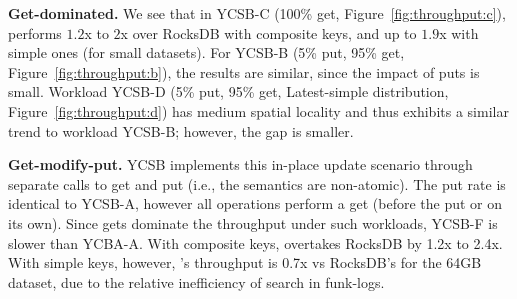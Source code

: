 
{\bf Get-dominated.} 
We see that in YCSB-C (100\% get, Figure~\ref{fig:throughput:c}), 
\sys\/ performs $1.2$x to $2$x over RocksDB with composite keys,
and up to $1.9$x  with simple ones (for small datasets). For YCSB-B (5\% put, 95\% get, Figure~\ref{fig:throughput:b}),
the results are similar, since the impact of puts is small.  
Workload YCSB-D (5\% put, 95\% get, Latest-simple distribution, Figure~\ref{fig:throughput:d})
has medium spatial locality and thus exhibits a similar trend to workload YCSB-B; however, the gap is smaller.%

{\bf Get-modify-put.} YCSB implements this in-place update scenario through separate calls to get and put (i.e., the semantics are non-atomic). 
The put rate is identical to YCSB-A, however all operations perform a get (before the put or on its own). Since gets dominate the throughput under such workloads, YCSB-F is slower than YCBA-A.
With composite keys, \sys\/ overtakes 
RocksDB by 1.2x to 2.4x. With simple keys, however, \sys's throughput is 0.7x vs RocksDB's for the 64GB dataset, due to the relative inefficiency of search in funk-logs. 

